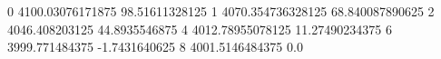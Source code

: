 0 4100.03076171875 98.51611328125
1 4070.354736328125 68.840087890625
2 4046.408203125 44.8935546875
4 4012.78955078125 11.27490234375
6 3999.771484375 -1.7431640625
8 4001.5146484375 0.0
